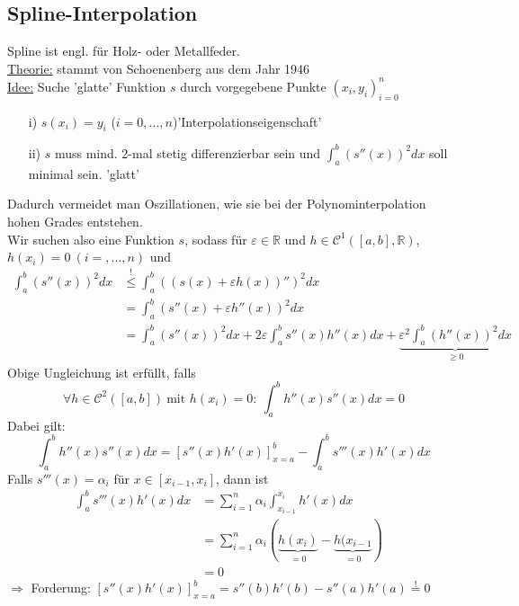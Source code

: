\documentclass[12pt]{article}
\theoremstyle{break}
\begin{document}
\subsection{Spline-Interpolation}
Spline ist engl. für Holz- oder Metallfeder.\\
\underline{Theorie:} stammt von Schoenenberg aus dem Jahr 1946\\
\underline{Idee:} Suche 'glatte' Funktion $s$ durch vorgegebene Punkte $(x_i, y_i)_{i=0}^n$
\begin{enumerate}
  \item[i)] $s(x_i)= y_i$ ($i=0,...,n$)'Interpolationseigenschaft'
  \item[ii)] $s$ muss mind. 2-mal stetig differenzierbar sein und $ \int_a^b (s''(x))^2dx $ soll minimal sein. 'glatt'
\end{enumerate}
Dadurch vermeidet man Oszillationen, wie sie bei der Polynominterpolation hohen Grades entstehen.\\
Wir suchen also eine Funktion $s$, sodass für $\varepsilon \in \mathbb{R}$ und $h \in \mathcal{C}^1([a,b], \mathbb{R})$, $h(x_i) = 0 \medspace (i=,...,n)$ und 
\begin{align*}
\int_a^b (s''(x))^2 dx &\overset{!}{\leq} \int_a^b \left( (s(x) + \varepsilon h(x))'' \right)^2 dx &\\
&= \int_a^b (s''(x) + \varepsilon h''(x))^2 dx &\\
&= \int_a^b (s''(x))^2 dx + 2\varepsilon \int_a^b s''(x)h''(x) dx + \underbrace{\varepsilon^2\int_a^b (h''(x))^2dx}_{ \geq 0 } 
\end{align*}
Obige Ungleichung ist erfüllt, falls 
$$ \forall h \in \mathcal{C}^2([a,b]) \medspace \text{mit }h(x_i) = 0: \medspace \int_a^b h''(x) s''(x) dx = 0$$
Dabei gilt:
$$ \int_a^b h''(x) s''(x) dx = \left[ s''(x) h'(x) \right]_{x=a}^b - \int_a^b s'''(x) h'(x)dx$$
Falls $s'''(x) = \alpha_i$ für $x \in [x_{i-1}, x_i]$, dann ist 
\begin{align*}
\int_a^b s'''(x) h'(x) dx &= \sum_{i=1}^n \alpha_i \int_{x_{i-1}}^{x_i} h'(x) dx &\\
&= \sum_{i=1}^n \alpha_i \left(\underbrace{h(x_i)}_{= 0} - \underbrace{h(x_{i-1}}_{= 0}\right) &\\
&= 0
\end{align*}
$\Rightarrow$ Forderung: $\left[s''(x) h'(x) \right]_{x=a}^b = s''(b)h'(b) - s''(a)h'(a) \overset{!}{=} 0$
\end{document}
